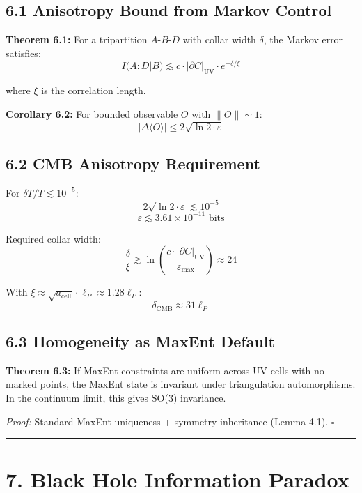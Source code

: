 \subsection{6.1 Anisotropy Bound from Markov Control}\label{61-anisotropy-bound-from-markov-control}

\textbf{Theorem 6.1:} For a tripartition \(A\)-\(B\)-\(D\) with collar width \(\delta\), the Markov error satisfies: \[I(A:D|B) \lesssim c \cdot |\partial C|_{\text{UV}} \cdot e^{-\delta/\xi}\]

where \(\xi\) is the correlation length.

\textbf{Corollary 6.2:} For bounded observable \(O\) with \(\|O\| \sim 1\): \[|\Delta\langle O \rangle| \leq 2\sqrt{\ln 2 \cdot \varepsilon}\]

\subsection{6.2 CMB Anisotropy Requirement}\label{62-cmb-anisotropy-requirement}

For \(\delta T/T \lesssim 10^{-5}\): \[2\sqrt{\ln 2 \cdot \varepsilon} \lesssim 10^{-5}\] \[\varepsilon \lesssim 3.61 \times 10^{-11} \text{ bits}\]

Required collar width: \[\frac{\delta}{\xi} \gtrsim \ln\left(\frac{c \cdot |\partial C|_{\text{UV}}}{\varepsilon_{\text{max}}}\right) \approx 24\]

With \(\xi \approx \sqrt{a_{\text{cell}}} \cdot \ell_P \approx 1.28 \ell_P\): \[\delta_{\text{CMB}} \approx 31 \ell_P\]

\subsection{6.3 Homogeneity as MaxEnt Default}\label{63-homogeneity-as-maxent-default}

\textbf{Theorem 6.3:} If MaxEnt constraints are uniform across UV cells with no marked points, the MaxEnt state is invariant under triangulation automorphisms. In the continuum limit, this gives SO(3) invariance.

\emph{Proof:} Standard MaxEnt uniqueness + symmetry inheritance (Lemma 4.1). \(\square\)

\begin{center}\rule{0.5\linewidth}{0.5pt}\end{center}

\section{7. Black Hole Information Paradox}\label{7-black-hole-information-paradox}


